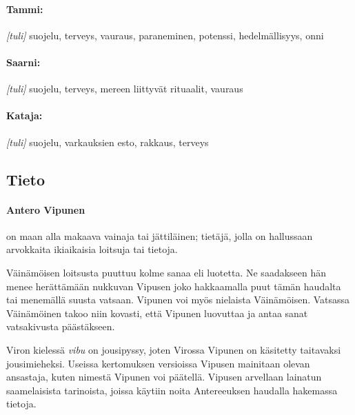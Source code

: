   \paragraph{Tammi:} \emph{[tuli]} suojelu, terveys, vauraus, paraneminen, potenssi, hedelmällisyys, onni
  \paragraph{Saarni:} \emph{[tuli]} suojelu, terveys, mereen liittyvät rituaalit, vauraus
  \paragraph{Kataja:} \emph{[tuli]} suojelu, varkauksien esto, rakkaus, terveys


\subsection{Tieto}

  \paragraph{Antero Vipunen} on maan alla makaava vainaja tai jättiläinen; tietäjä, jolla on
    hallussaan arvokkaita ikiaikaisia loitsuja tai tietoja. \par
    Väinämöisen loitsusta puuttuu kolme sanaa eli luotetta. Ne saadakseen hän menee herättämään
    nukkuvan Vipusen joko hakkaamalla puut tämän haudalta tai menemällä suusta vatsaan. Vipunen
    voi myös nielaista Väinämöisen. Vatsassa Väinämöinen takoo niin kovasti, että Vipunen
    luovuttaa ja antaa sanat vatsakivusta päästäkseen. \par
    Viron kielessä \emph{vibu} on jousipyssy, joten Virossa Vipunen on käsitetty taitavaksi
    jousimieheksi. Useissa kertomuksen versioissa Vipusen mainitaan olevan ansastaja, kuten
    nimestä Vipunen voi päätellä. Vipusen arvellaan lainatun saamelaisista tarinoista, joissa
    käytiin noita Antereeuksen haudalla hakemassa tietoja.
